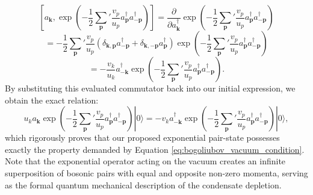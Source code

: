 \[
    \left[ a_{\mathbf{k}}, \exp\left( -\frac{1}{2} \sum_{\mathbf{p}}' \frac{v_p}{u_p} a_{\mathbf{p}}^\dagger a_{-\mathbf{p}}^\dagger \right) \right] = \frac{\partial}{\partial a_{\mathbf{k}}^\dagger} \exp\left( -\frac{1}{2} \sum_{\mathbf{p}}' \frac{v_p}{u_p} a_{\mathbf{p}}^\dagger a_{-\mathbf{p}}^\dagger \right)
\]
\[
    = -\frac{1}{2} \sum_{\mathbf{p}}' \frac{v_p}{u_p} (\delta_{\mathbf{k}, \mathbf{p}} a_{-\mathbf{p}}^\dagger + \delta_{\mathbf{k}, -\mathbf{p}} a_{\mathbf{p}}^\dagger) \exp\left( -\frac{1}{2} \sum_{\mathbf{p}}' \frac{v_p}{u_p} a_{\mathbf{p}}^\dagger a_{-\mathbf{p}}^\dagger \right)
\]
\[
    = -\frac{v_k}{u_k} a_{-\mathbf{k}}^\dagger \exp\left( -\frac{1}{2} \sum_{\mathbf{p}}' \frac{v_p}{u_p} a_{\mathbf{p}}^\dagger a_{-\mathbf{p}}^\dagger \right).
\]
By substituting this evaluated commutator back into our initial expression, we obtain the exact relation:
\[
    u_k a_{\mathbf{k}} \exp\left( -\frac{1}{2} \sum_{\mathbf{p}}' \frac{v_p}{u_p} a_{\mathbf{p}}^\dagger a_{-\mathbf{p}}^\dagger \right) |0\rangle = -v_k a_{-\mathbf{k}}^\dagger \exp\left( -\frac{1}{2} \sum_{\mathbf{p}}' \frac{v_p}{u_p} a_{\mathbf{p}}^\dagger a_{-\mathbf{p}}^\dagger \right) |0\rangle,
\]
which rigorously proves that our proposed exponential pair-state possesses exactly the property demanded by Equation \ref{eq:bogoliubov_vacuum_condition}. Note that the exponential operator acting on the vacuum creates an infinite superposition of bosonic pairs with equal and opposite non-zero momenta, serving as the formal quantum mechanical description of the condensate depletion.

